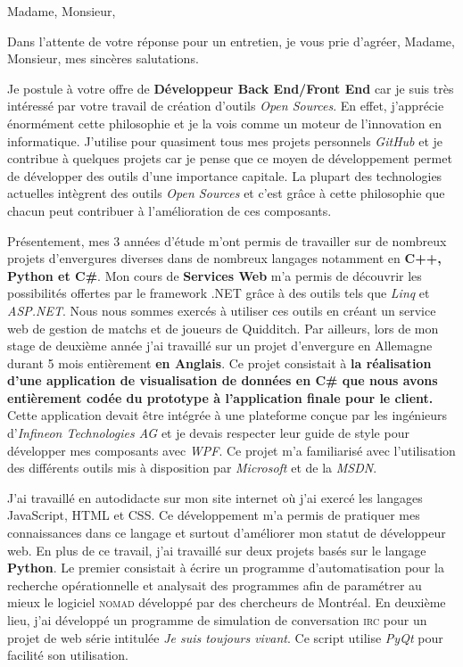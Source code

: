 \date{\today}
\opening{Madame, Monsieur,}
\closing{Dans l'attente de votre réponse pour un entretien, je vous prie d'agréer, Madame, Monsieur, mes sincères salutations.}

\makelettertitle

\introduction{}
Je postule à votre offre de \textbf{Développeur Back End/Front End} car je suis très intéressé par votre travail de création d'outils \textit{Open Sources}. En effet, j'apprécie énormément cette philosophie et je la vois comme un moteur de l'innovation en informatique. J'utilise pour quasiment tous mes projets personnels \textit{GitHub} et je contribue à quelques projets car je pense que ce moyen de développement permet de développer des outils d'une importance capitale. La plupart des technologies actuelles intègrent des outils \textit{Open Sources} et c'est grâce à cette philosophie que chacun peut contribuer à l'amélioration de ces composants.

Présentement, mes 3 années d'étude m'ont permis de travailler sur de nombreux projets d'envergures diverses dans de nombreux langages notamment en \textbf{C++, Python et C\#}. Mon cours de \textbf{Services Web} m'a permis de découvrir les possibilités offertes par le framework .NET grâce à des outils tels que \textit{Linq} et \textit{ASP.NET}. Nous nous sommes exercés à utiliser ces outils en créant un service web de gestion de matchs et de joueurs de Quidditch. Par ailleurs, lors de mon stage de deuxième année j'ai travaillé sur un projet d'envergure en Allemagne durant 5 mois entièrement \textbf{en Anglais}. Ce projet consistait à \textbf{la réalisation d'une application de visualisation de données en C\# que nous avons entièrement codée du prototype à l'application finale pour le client.} Cette application devait être intégrée à une plateforme conçue par les ingénieurs d'\textit{Infineon Technologies AG} et je devais respecter leur guide de style pour développer mes composants avec \textit{WPF}. Ce projet m'a familiarisé avec l'utilisation des différents outils mis à disposition par \textit{Microsoft} et de la \textit{MSDN}.

J'ai travaillé en autodidacte sur mon site internet où j'ai exercé les langages JavaScript, HTML et CSS. Ce développement m'a permis de pratiquer mes connaissances dans ce langage et surtout d'améliorer mon statut de développeur web. En plus de ce travail, j'ai travaillé sur deux projets basés sur le langage \textbf{Python}. Le premier consistait à écrire un programme d'automatisation pour la recherche opérationnelle et analysait des programmes afin de paramétrer au mieux le logiciel \textsc{nomad} développé par des chercheurs de Montréal. En deuxième lieu, j'ai développé un programme de simulation de conversation \textsc{irc} pour un projet de web série intitulée \textit{Je suis toujours vivant}. Ce script utilise \textit{PyQt} pour facilité son utilisation. \conclusion{}

\makeletterclosing
